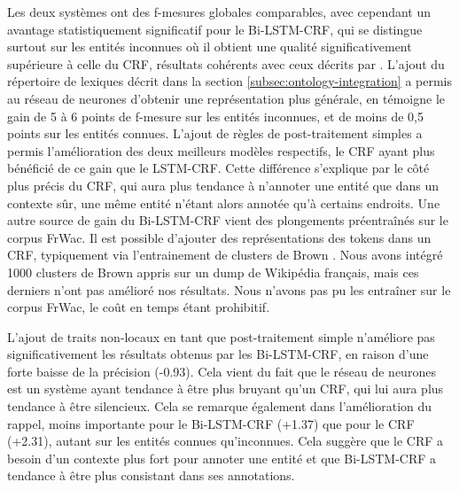 \documentclass[citation\_needed]{subfiles}
\begin{document}
Les deux systèmes ont des f-mesures globales comparables, avec cependant un avantage statistiquement significatif pour le Bi-LSTM-CRF, qui se distingue surtout sur les entités inconnues où il obtient une qualité significativement supérieure à celle du CRF, résultats cohérents avec ceux décrits par \citet{augenstein2017generalisation}. L'ajout du répertoire de lexiques décrit dans la section \ref{subsec:ontology-integration} a permis au réseau de neurones d'obtenir une représentation plus générale, en témoigne le gain de 5 à 6 points de f-mesure sur les entités inconnues, et de moins de 0,5 points sur les entités connues. L'ajout de règles de post-traitement simples a permis l'amélioration des deux meilleurs modèles respectifs, le CRF ayant plus bénéficié de ce gain que le LSTM-CRF. Cette différence s'explique par le côté plus précis du CRF, qui aura plus tendance à n'annoter une entité que dans un contexte sûr, une même entité n'étant alors annotée qu'à certains endroits. Une autre source de gain du Bi-LSTM-CRF vient des plongements préentraînés sur le corpus FrWac. Il est possible d'ajouter des représentations des tokens dans un CRF, typiquement via l'entrainement de clusters de Brown \citep{brown1992class}. Nous avons intégré 1000 clusters de Brown appris sur un dump de Wikipédia français, mais ces derniers n'ont pas amélioré nos résultats. Nous n'avons pas pu les entraîner sur le corpus FrWac, le coût en temps étant prohibitif.

L'ajout de traits non-locaux en tant que post-traitement simple n'améliore pas significativement les résultats obtenus par les Bi-LSTM-CRF, en raison d'une forte baisse de la précision (-0.93). Cela vient du fait que le réseau de neurones est un système ayant tendance à être plus bruyant qu'un CRF, qui lui aura plus tendance à être silencieux. Cela se remarque également dans l'amélioration du rappel, moins importante pour le Bi-LSTM-CRF (+1.37) que pour le CRF (+2.31), autant sur les entités connues qu'inconnues. Cela suggère que le CRF a besoin d'un contexte plus fort pour annoter une entité et que Bi-LSTM-CRF a tendance à être plus consistant dans ses annotations.
\end{document}
